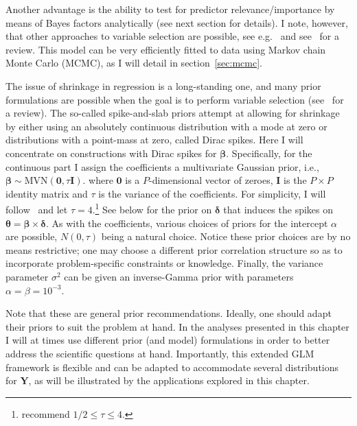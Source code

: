 Another advantage is the ability to test for predictor relevance/importance by means of Bayes factors analytically (see next section for details).
I note, however, that other approaches to variable selection are possible, see e.g.~\cite{Mitchell1988,George1993} and see~\cite{OHara2009} for a review.
This model can be very efficiently fitted to data using Markov chain Monte Carlo (MCMC), as I will detail in section~\ref{sec:mcmc}.

The issue of shrinkage in regression is a long-standing one, and many prior formulations are possible when the goal is to perform variable selection (see~\cite{Malsiner2016} for a review).
The so-called spike-and-slab priors attempt at allowing for shrinkage by either using an absolutely continuous distribution with a mode at zero or distributions with a point-mass at zero, called Dirac spikes.
Here I will concentrate on constructions with Dirac spikes for $\boldsymbol\beta$.
Specifically, for the continuous part I  assign the coefficients a multivariate Gaussian prior, i.e., $\boldsymbol\beta \sim \text{MVN}(\boldsymbol 0, \tau \boldsymbol I)$.
where $\boldsymbol 0$ is a $P$-dimensional vector of zeroes, $\boldsymbol I$ is the $P \times P$ identity matrix and $\tau$ is the variance of the coefficients.
For simplicity, I will follow~\cite{Lemey2014} and let $\tau = 4$.\footnote{\cite{Kuo1998} recommend $1/2 \leq \tau \leq 4$.}
See below for the prior on $\boldsymbol\delta$ that induces the spikes on $\boldsymbol\theta = \boldsymbol\beta \times \boldsymbol\delta$.
As with the coefficients, various choices of priors for the intercept $\alpha$ are possible,  $N(0, \tau)$ being a natural choice.
Notice these prior choices are by no means restrictive; one may choose a different prior correlation structure so as to incorporate problem-specific constraints or knowledge.
Finally, the variance parameter $\sigma^2$  can be given an inverse-Gamma prior with parameters $\alpha = \beta = 10^{-3}$.

Note that these are general prior recommendations.
Ideally, one should adapt their priors to suit the problem at hand.
In the analyses presented in this chapter I will at times use different prior (and model) formulations in order to better address the scientific questions at hand. 
Importantly, this extended GLM framework is flexible and can be adapted to accommodate several distributions for $\boldsymbol Y$, as will be illustrated by the applications explored in this chapter.

